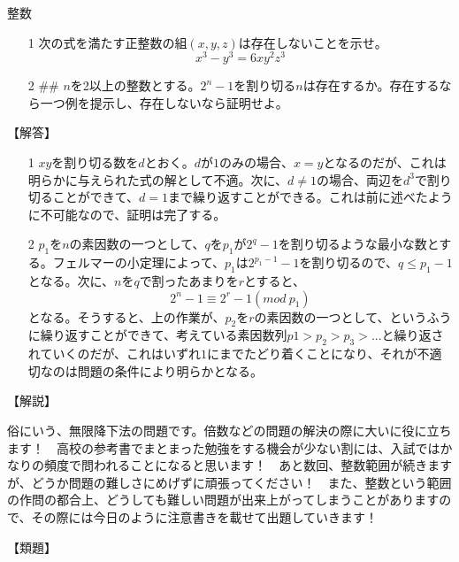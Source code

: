 \documentclass[a4paper,fleqn,dvipdfmx]{jsarticle}
\begin{document}
\begin{itembox}[l]{整数}

\begin{itemize}
    \item [1] 
    次の式を満たす正整数の組$(x,y,z)$は存在しないことを示せ。
    $$x^3-y^3=6xy^2z^3$$
    \item [2] \#\#
    $n$を2以上の整数とする。$2^n-1$を割り切る$n$は存在するか。存在するなら一つ例を提示し、存在しないなら証明せよ。
\end{itemize}

\end{itembox}


\begin{flushleft}
【解答】
\end{flushleft}

\begin{itemize}
    \item [1] 
    $xy$を割り切る数を$d$とおく。$d$が$1$のみの場合、$x=y$となるのだが、これは明らかに与えられた式の解として不適。次に、$d\neq 1$の場合、両辺を$d^3$で割り切ることができて、$d=1$まで繰り返すことができる。これは前に述べたように不可能なので、証明は完了する。
    
    \item [2]
    $p_1$を$n$の素因数の一つとして、$q$を$p_1$が$2^q-1$を割り切るような最小な数とする。フェルマーの小定理によって、$p_1$は$2^{p_1-1}-1$を割り切るので、$q\leq p_1-1$となる。次に、$n$を$q$で割ったあまりを$r$とすると、
    $$2^n-1\equiv2^r-1(mod\ p_1)$$
    となる。そうすると、上の作業が、$p_2$を$r$の素因数の一つとして、というふうに繰り返すことができて、考えている素因数列$p1>p_2>p_3>...$と繰り返されていくのだが、これはいずれ$1$にまでたどり着くことになり、それが不適切なのは問題の条件により明らかとなる。
    
\end{itemize}


\begin{flushleft}
【解説】
\end{flushleft}

俗にいう、無限降下法の問題です。倍数などの問題の解決の際に大いに役に立ちます！　高校の参考書でまとまった勉強をする機会が少ない割には、入試ではかなりの頻度で問われることになると思います！　あと数回、整数範囲が続きますが、どうか問題の難しさにめげずに頑張ってください！　また、整数という範囲の作問の都合上、どうしても難しい問題が出来上がってしまうことがありますので、その際には今日のように注意書きを載せて出題していきます！


\begin{flushleft}
【類題】
\end{flushleft}
\end{document}

